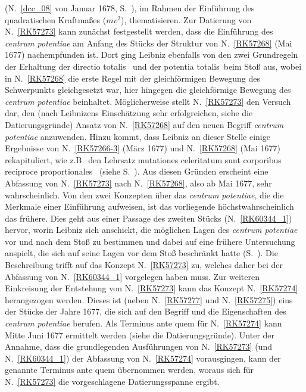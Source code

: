 \begin{ledgroup}
%
(N.~\ref{dcc_08} von Januar 1678, S.~),
%
im Rahmen der Einführung des quadratischen Kraftmaßes ($mv^2$), thematisieren.
%
\pend
%
\pstart
Zur Datierung von N.~\ref{RK57273} kann zunächst festgestellt werden, dass
%
die Einführung des \textit{centrum potentiae} am Anfang des Stücks der Struktur
%
von N.~\ref{RK57268} (Mai 1677) nachempfunden ist.
%
Dort ging Leibniz ebenfalls von den zwei Grundregeln der Erhaltung der \glqq directio totalis\grqq\ 
%
und der \glqq potentia totalis\grqq\  beim Stoß aus, wobei in N.~\ref{RK57268} die erste Regel mit 
%
der gleichförmigen Bewegung des Schwerpunkts gleichgesetzt war,
%
hier hingegen die gleichförmige Bewegung des \textit{centrum potentiae} beinhaltet.
%
Möglicherweise stellt N.~\ref{RK57273} den Versuch dar, den
%
(nach Leibnizens Einschätzung sehr erfolgreichen, siehe die Datierungsgründe) Ansatz von  N.~\ref{RK57268}
%
auf den neuen Begriff \textit{centrum potentiae} anzuwenden.
%
Hinzu kommt, dass Leibniz an dieser Stelle einige Ergebnisse von N.~\ref{RK57266-3} (März 1677) und N.~\ref{RK57268} (Mai 1677) rekapituliert, 
%
wie z.B.\ den Lehrsatz \glqq mutationes celeritatum sunt corporibus reciproce proportionales\grqq\ 
%
(siehe S.~\refpassage{37_05_146-147_21a}{37_05_146-147_21b}).
%
Aus diesen Gründen erscheint eine Abfassung von N.~\ref{RK57273} 
%
nach N.~\ref{RK57268}, also ab Mai 1677, sehr wahrscheinlich.
%
\pend
%
\pstart
Von den zwei Konzepten über das \textit{centrum potentiae}, die die Merkmale einer Einführung aufweisen, 
%
ist das vorliegende höchstwahrscheinlich das frühere.
%
Dies geht aus einer Passage des zweiten Stücks (N.~\ref{RK60344_1}) hervor,
%
worin Leibniz sich anschickt, die möglichen Lagen des \textit{centrum potentiae} vor und nach dem Stoß
%
zu bestimmen und dabei auf eine frühere Untersuchung anspielt, 
%
die sich auf seine Lagen vor dem Stoß beschränkt hatte
%
(S.~).
%
Die Beschreibung trifft auf das Konzept N.~\ref{RK57273} zu, welches daher bei der Abfassung von N.~\ref{RK60344_1} vorgelegen haben muss.
\pend
%
\pstart
Zur weiteren Einkreisung der Entstehung von N.~\ref{RK57273} kann das Konzept N.~\ref{RK57274} herangezogen werden.
%
Dieses ist (neben N.~\ref{RK57277} und N.~\ref{RK57275}) eins der Stücke der Jahre 1677\textendash1678, die 
sich auf den Begriff und die Eigenschaften des \textit{centrum potentiae} berufen.
%
Als Terminus ante quem für N.~\ref{RK57274} kann  Mitte Juni 1677 ermittelt werden (siehe die Datierungsgründe). 
%
Unter der Annahme, dass die grundlegenden Ausführungen von N.~\ref{RK57273} 
%
(und N.~\ref{RK60344_1}) der Abfassung von N.~\ref{RK57274} vorausgingen, 
%
kann der genannte Terminus ante quem übernommen werden,
%
woraus sich für N.~\ref{RK57273} die vorgeschlagene Datierungsspanne ergibt.
\pend 
\end{ledgroup}
